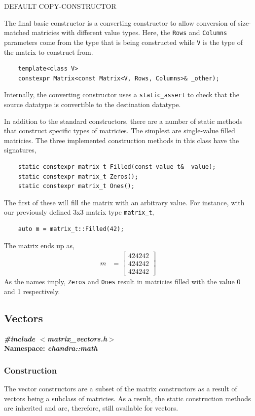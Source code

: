 \documentclass[10pt,letterpaper]{memoir} %
\newcommand{\apiheader}[2]{\noindent{}\textbf{\emph{\#include $<$#1$>$}}\\\noindent{}\textbf{Namespace: \emph{#2}}}
\begin{document}
DEFAULT COPY-CONSTRUCTOR

The final basic constructor is a converting constructor to allow conversion of size-matched matricies with different value types.  Here, the \texttt{Rows} and \texttt{Columns} parameters come from the type that is being constructed while \texttt{V} is the type of the matrix to construct from.
\begin{verbatim}
	template<class V>
	constexpr Matrix<const Matrix<V, Rows, Columns>& _other);
\end{verbatim}
Internally, the converting constructor uses a \texttt{static_assert} to check that the source datatype is convertible to the destination datatype.

In addition to the standard constructors, there are a number of static methods that construct specific types of matricies.  The simplest are single-value filled matricies.  The three implemented construction methods in this class have the signatures,
\begin{verbatim}
	static constexpr matrix_t Filled(const value_t& _value);
	static constexpr matrix_t Zeros();
	static constexpr matrix_t Ones();
\end{verbatim}
The first of these will fill the matrix with an arbitrary value.  For instance, with our previously defined 3x3 matrix type \texttt{matrix_t},
\begin{verbatim}
	auto m = matrix_t::Filled(42);
\end{verbatim}
The matrix ends up as,
\begin{align}
	m &= \begin{bmatrix} 42 42 42 \\ 42 42 42 \\ 42 42 42 \end{bmatrix} 
\end{align}
As the names imply, \texttt{Zeros} and \texttt{Ones} result in matricies filled with the value 0 and 1 respectively.


\subsection{Vectors}
\label{sec:math:vectors}
\apiheader{matrix\_vectors.h}{chandra::math}

\subsubsection{Construction}
The vector constructors are a subset of the matrix constructors as a result of vectors being a subclass of matricies.  As a result, the static construction methods are inherited and are, therefore, still available for vectors.
\end{document}
